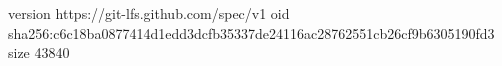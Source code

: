 version https://git-lfs.github.com/spec/v1
oid sha256:c6c18ba0877414d1edd3dcfb35337de24116ac28762551cb26cf9b6305190fd3
size 43840
